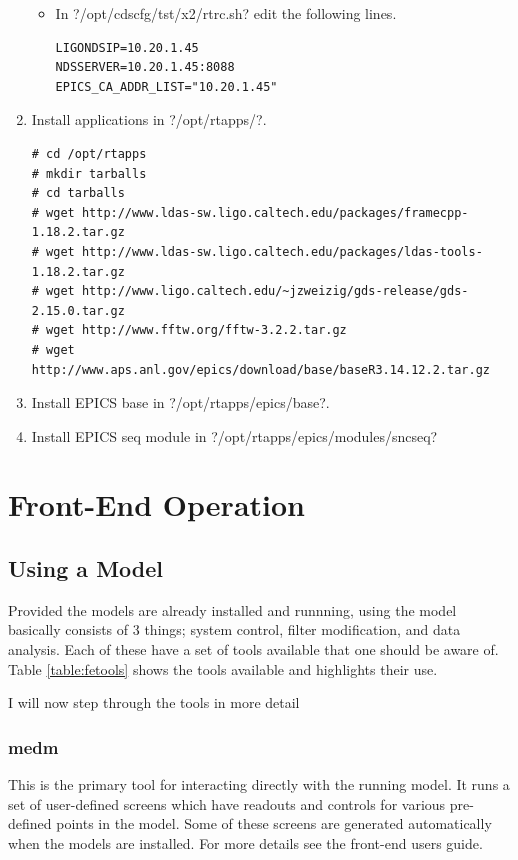 \begin{enumerate}
\begin{itemize}
\item In \lstin?/opt/cdscfg/tst/x2/rtrc.sh? edit the following lines.
\begin{lstlisting}
LIGONDSIP=10.20.1.45
NDSSERVER=10.20.1.45:8088
EPICS_CA_ADDR_LIST="10.20.1.45"
\end{lstlisting}
\end{itemize}
\item Install applications in \lstin?/opt/rtapps/?.
\begin{lstlisting}
# cd /opt/rtapps
# mkdir tarballs
# cd tarballs
# wget http://www.ldas-sw.ligo.caltech.edu/packages/framecpp-1.18.2.tar.gz
# wget http://www.ldas-sw.ligo.caltech.edu/packages/ldas-tools-1.18.2.tar.gz
# wget http://www.ligo.caltech.edu/~jzweizig/gds-release/gds-2.15.0.tar.gz
# wget http://www.fftw.org/fftw-3.2.2.tar.gz
# wget http://www.aps.anl.gov/epics/download/base/baseR3.14.12.2.tar.gz
\end{lstlisting}
\item Install EPICS base in \lstin?/opt/rtapps/epics/base?.
\item Install EPICS seq module in \lstin?/opt/rtapps/epics/modules/sncseq?
\end{enumerate}


\section{Front-End Operation}

\subsection{Using a Model}

Provided the models are already installed and runnning, using the model
basically consists of 3 things; system control, filter
modification, and data analysis. Each of these have a set of tools available
that one should be aware of. Table \ref{table:fetools} shows the tools available
and highlights their use.

I will now step through the tools in more detail

\subsubsection{medm}
This is the primary tool for interacting directly with the running model. It
runs a set of user-defined screens which have readouts and controls for various
pre-defined points in the model. Some of these screens are generated
automatically when the models are installed. For more details see
the front-end users guide.

